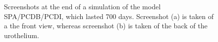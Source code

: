 \begin{figure}[ht]
\begin{center}
\end{center}
\begin{center}
\end{center}
\caption[Simulated urothel with the model SPA/PCDB/PCDI at day 700]{\label{img:720daysScreenshotSPA/BCPD/IPCD}Screenshots at the end of a simulation of the model SPA/PCDB/PCDI, which lasted 700 days. Screenshot (a) is taken of a the front view, whereas screenshot (b) is taken of the back of the urothelium.}

\end{figure}



